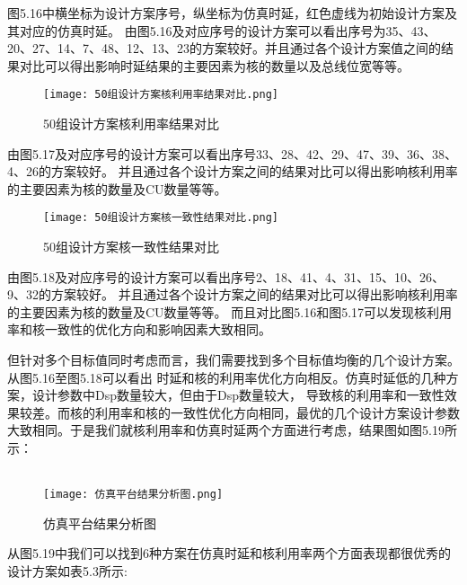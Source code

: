 图5.16中横坐标为设计方案序号，纵坐标为仿真时延，红色虚线为初始设计方案及其对应的仿真时延。
由图5.16及对应序号的设计方案可以看出序号为35、43、20、27、14、7、48、12、13、23的方案较好。并且通过各个设计方案值之间的结果对比可以得出影响时延结果的主要因素为核的数量以及总线位宽等等。
\begin{figure}[h]
    \centering
    \texttt{[image: 50组设计方案核利用率结果对比.png]}
    \caption{50组设计方案核利用率结果对比}
    \label{fig:badge}
\end{figure}

由图5.17及对应序号的设计方案可以看出序号33、28、42、29、47、39、36、38、4、26的方案较好。
并且通过各个设计方案之间的结果对比可以得出影响核利用率的主要因素为核的数量及CU数量等等。

\begin{figure}[h]
    \centering
    \texttt{[image: 50组设计方案核一致性结果对比.png]}
    \caption{50组设计方案核一致性结果对比}
    \label{fig:badge}
\end{figure}

由图5.18及对应序号的设计方案可以看出序号2、18、41、4、31、15、10、26、9、32的方案较好。
并且通过各个设计方案之间的结果对比可以得出影响核利用率的主要因素为核的数量及CU数量等等。
而且对比图5.16和图5.17可以发现核利用率和核一致性的优化方向和影响因素大致相同。

但针对多个目标值同时考虑而言，我们需要找到多个目标值均衡的几个设计方案。从图5.16至图5.18可以看出
时延和核的利用率优化方向相反。仿真时延低的几种方案，设计参数中Dsp数量较大，但由于Dsp数量较大，
导致核的利用率和一致性效果较差。而核的利用率和核的一致性优化方向相同，最优的几个设计方案设计参数
大致相同。于是我们就核利用率和仿真时延两个方面进行考虑，结果图如图5.19所示：
\\
\\
\begin{figure}[h]
    \centering
    \texttt{[image: 仿真平台结果分析图.png]}
    \caption{仿真平台结果分析图}
    \label{fig:badge}
\end{figure}

从图5.19中我们可以找到6种方案在仿真时延和核利用率两个方面表现都很优秀的设计方案如表5.3所示:

